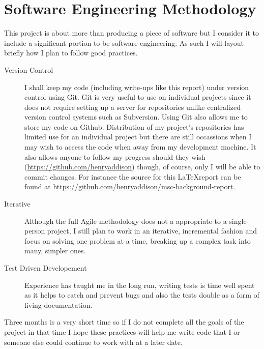 \appendix
\chapter{Software Engineering Methodology} \label{app:sem}
This project is about more than producing a piece of software but I
consider it to include a significant portion to be software
engineering.  As such I will layout briefly how I plan to follow good
practices. 

\begin{description}
  \item[Version Control] I shall keep my
code (including write-ups like this report) under version control
using Git. Git is very useful to use on individual projects since it
does not require setting up a server for repositories unlike centralized
version control systems such as Subversion. Using Git also allows me
to store my code on Github. Distribution of my project's repositories
has limited use for an individual project but there are still
occassions when I may wish to access the code when away from my
development machine. It also allows anyone to follow my progress
should they wish (\url{https://github.com/henryaddison}) though, of
course, only I will be able to commit changes.
For instance the source for this \LaTeX  report can be found at
\url{https://github.com/henryaddison/msc-background-report}. 

  \item[Iterative] Although the full Agile methodology does not a appropriate to a single-person
project, I still plan to work in an iterative, incremental fashion and
focus on solving one problem at a time, breaking up a complex
task into many, simpler ones. 

  \item[Test Driven Developement] Experience has taught me in the long run, writing
tests is time well spent as it helps to catch and prevent bugs and
also the tests double as a form of living documentation. 

\end{description}

Three months is a very short time so if I do not complete all the goals of the project in
that time I hope these practices will help me write code that I or someone else
could continue to work with at a later date.
